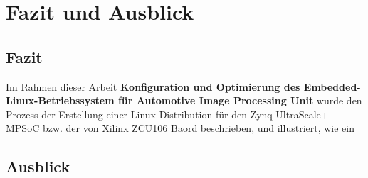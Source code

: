 \chapter{Fazit und Ausblick}
\label{cha:Fazit_und_Ausblick}


\section{Fazit}
\label{cha:Fa_und_Aus:sec:Fazit}

Im Rahmen dieser Arbeit \textbf{Konfiguration und Optimierung des Embedded-Linux-Betriebssystem für Automotive Image Processing Unit} wurde den Prozess der Erstellung einer Linux-Distribution für den Zynq UltraScale+ MPSoC bzw. der von Xilinx ZCU106 Baord beschrieben, und illustriert, wie ein  

\section{Ausblick}
\label{cha:Fa_und_Aus:sec:Ausblick}